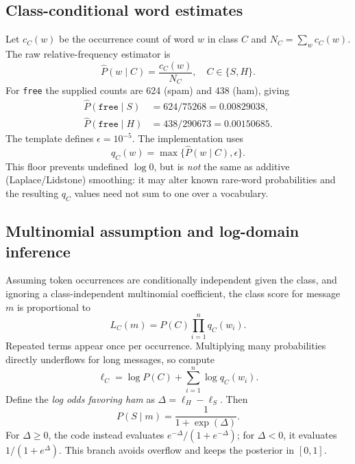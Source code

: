 \documentclass[11pt,letterpaper]{article}
\begin{document}
\subsection{Class-conditional word estimates}
Let $c_C(w)$ be the occurrence count of word $w$ in class $C$ and $N_C=\sum_{w}c_C(w)$. The raw relative-frequency estimator is
\begin{equation}\label{eq:likelihood}
\widehat P(w\mid C)=\frac{c_C(w)}{N_C},\quad C\in\{S,H\}.
\end{equation}
For \texttt{free} the supplied counts are 624 (spam) and 438 (ham), giving
\begin{align}\label{eq:free}
\widehat P(\texttt{free}\mid S)&=624/75268=0.00829038,\\
\widehat P(\texttt{free}\mid H)&=438/290673=0.00150685.
\end{align}
The template defines $\epsilon=10^{-5}$. The implementation uses
\begin{equation}\label{eq:floor}
q_C(w)=\max\{\widehat P(w\mid C),\epsilon\}.
\end{equation}
This floor prevents undefined $\log 0$, but is \emph{not} the same as additive (Laplace/Lidstone) smoothing: it may alter known rare-word probabilities and the resulting $q_C$ values need not sum to one over a vocabulary.

\subsection{Multinomial assumption and log-domain inference}
Assuming token occurrences are conditionally independent given the class, and ignoring a class-independent multinomial coefficient, the class score for message $m$ is proportional to
\begin{equation}\label{eq:product}
L_C(m)=P(C)\prod_{i=1}^{n}q_C(w_i).
\end{equation}
Repeated terms appear once per occurrence. Multiplying many probabilities directly underflows for long messages, so compute
\begin{equation}\label{eq:logscore}
\ell_C=\log P(C)+\sum_{i=1}^{n}\log q_C(w_i).
\end{equation}
Define the \emph{log odds favoring ham} as $\Delta=\ell_H-\ell_S$. Then
\begin{equation}\label{eq:sigmoid}
P(S\mid m)=\frac{1}{1+\exp(\Delta)}.
\end{equation}
For $\Delta\ge0$, the code instead evaluates $e^{-\Delta}/(1+e^{-\Delta})$; for $\Delta<0$, it evaluates $1/(1+e^{\Delta})$. This branch avoids overflow and keeps the posterior in $[0,1]$.
\end{document}
